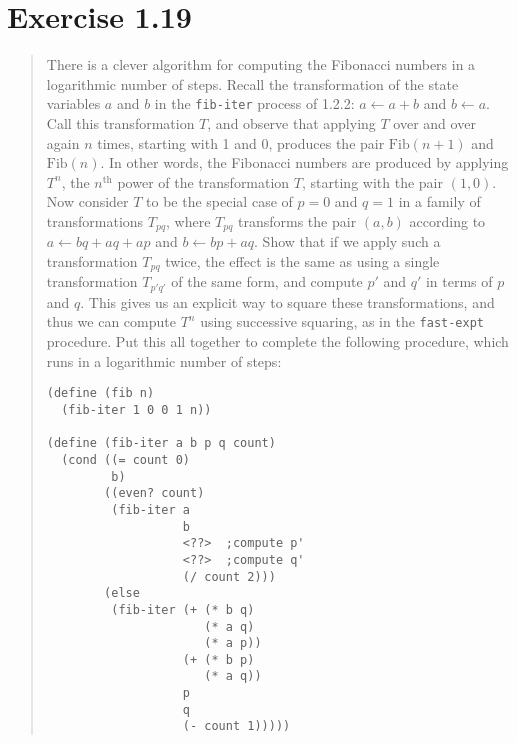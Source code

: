 \documentclass{article}
\begin{document}


\section{Exercise 1.19}
\begin{quote}
    There is a clever algorithm for computing the Fibonacci numbers in a
    logarithmic number of steps. Recall the transformation of the state
    variables $a$ and $b$ in the \texttt{fib-iter} process of 1.2.2:
    $a \leftarrow a+b$ and $b \leftarrow a$. Call this transformation $T$, and
    observe that applying $T$ over and over again $n$ times, starting with 1
    and 0, produces the pair $\textrm{Fib}(n+1)$ and $\textrm{Fib}(n)$. In
    other words, the Fibonacci numbers are produced by applying $T^n$, the
    $n^\textrm{th}$ power of the transformation $T$, starting with the pair
    $(1,0)$. Now consider $T$ to be the special case of $p=0$ and $q=1$ in a
    family of transformations $T_{pq}$, where $T_{pq}$ transforms the pair
    $(a,b)$ according to $a \leftarrow bq+aq+ap$ and $b \leftarrow bp+aq$. Show
    that if we apply such a transformation $T_{pq}$ twice, the effect is the
    same as using a single transformation $T_{p'q'}$ of the same form, and
    compute $p'$ and $q'$ in terms of $p$ and $q$. This gives us an explicit
    way to square these transformations, and thus we can compute $T^n$ using
    successive squaring, as in the \texttt{fast-expt} procedure. Put this all
    together to complete the following procedure, which runs in a logarithmic
    number of steps:
	\begin{lstlisting}
(define (fib n)
  (fib-iter 1 0 0 1 n))

(define (fib-iter a b p q count)
  (cond ((= count 0)
         b)
        ((even? count)
         (fib-iter a
                   b
                   <??>  ;compute p'
                   <??>  ;compute q'
                   (/ count 2)))
        (else
         (fib-iter (+ (* b q)
                      (* a q)
                      (* a p))
                   (+ (* b p)
                      (* a q))
                   p
                   q
                   (- count 1)))))
	\end{lstlisting}
\end{quote}
\end{document}
